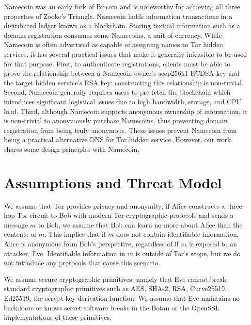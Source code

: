 \documentclass{sig-alternate}
\begin{document}
Namecoin\cite{NamecoinHome}\cite{jacobs2014providing} was an early fork of Bitcoin\cite{nakamoto2008bitcoin} and is noteworthy for achieving all three properties of Zooko's Triangle. Namecoin holds information transactions in a distributed ledger known as a blockchain. Storing textual information such as a domain registration consumes some Namecoins, a unit of currency. While Namecoin is often advertised as capable of assigning names to Tor hidden services, it has several practical issues that make it generally infeasible to be used for that purpose. First, to authenticate registrations, clients must be able to prove the relationship between a Namecoin owner's secp256k1 ECDSA key and the target hidden service's RSA key: constructing this relationship is non-trivial. Second, Namecoin generally requires users to pre-fetch the blockchain which introduces significant logistical issues due to high bandwidth, storage, and CPU load. Third, although Namecoin supports anonymous ownership of information, it is non-trivial to anonymously purchase Namecoins, thus preventing domain registration from being truly anonymous. These issues prevent Namecoin from being a practical alternative DNS for Tor hidden service. However, our work shares some design principles with Namecoin.

\section{Assumptions and Threat Model}

We assume that Tor provides privacy and anonymity; if Alice constructs a three-hop Tor circuit to Bob with modern Tor cryptographic protocols and sends a message $ m $ to Bob, we assume that Bob can learn no more about Alice than the contents of $ m $. This implies that if $ m $ does not contain identifiable information, Alice is anonymous from Bob's perspective, regardless of if $ m $ is exposed to an attacker, Eve. Identifiable information in $ m $ is outside of Tor's scope, but we do not introduce any protocols that cause this scenario.

We assume secure cryptographic primitives; namely that Eve cannot break standard cryptographic primitives such as AES, SHA-2, RSA, Curve25519, Ed25519, the scrypt key derivation function. We assume that Eve maintains no backdoors or knows secret software breaks in the Botan or the OpenSSL implementations of these primitives.

\end{document}
